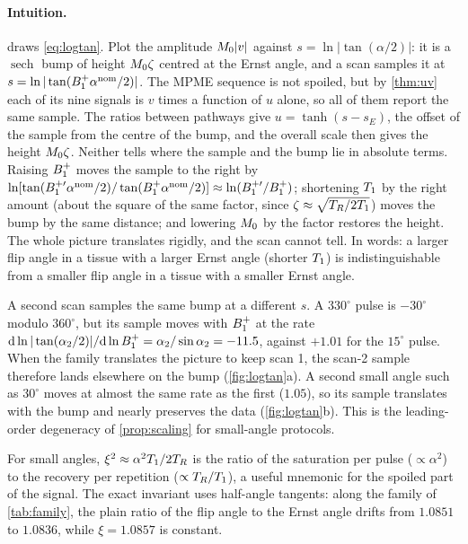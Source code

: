 \paragraph{Intuition.}  draws \eqref{eq:logtan}. Plot the amplitude $M_0|v|$ against
$s=\ln|\tan(\alpha/2)|$: it is a $\operatorname{sech}$ bump of height $M_0\zeta$ centred at the Ernst angle, and a scan
samples it at $s=\ln|\tan(B_1^{+}\alpha^{\rm nom}/2)|$. The MPME sequence is not spoiled, but by
\cref{thm:uv} each of its nine signals is $v$ times a function of $u$ alone, so all of them
report the same sample. The ratios between pathways give $u=\tanh(s-s_E)$, the offset of the
sample from the centre of the bump, and the overall scale then gives the height $M_0\zeta$.
Neither tells where the sample and the bump lie in absolute terms. Raising $B_1^{+}$ moves the
sample to the right by $\ln[\tan(B_1^{+\prime}\alpha^{\rm nom}/2)/\tan(B_1^{+}\alpha^{\rm nom}/2)]\approx\ln(B_1^{+\prime}/B_1^{+})$; shortening $T_1$
by the right amount (about the square of the same factor, since $\zeta\approx\sqrt{T_R/2T_1}$) moves the
bump by the same distance; and lowering $M_0$ by the factor restores the height. The whole
picture translates rigidly, and the scan cannot tell. In words: a larger flip angle in a tissue
with a larger Ernst angle (shorter $T_1$) is indistinguishable from a smaller flip angle in a
tissue with a smaller Ernst angle.

A second scan samples the same bump at a different $s$. A $330^\circ$ pulse is $-30^\circ$ modulo
$360^\circ$, but its sample moves with $B_1^{+}$ at the rate $\mathrm d\ln|\tan(\alpha_2/2)|/\mathrm d\ln B_1^{+}=\alpha_2/\sin\alpha_2=-11.5$,
against $+1.01$ for the $15^\circ$ pulse. When the family translates the picture to keep scan 1,
the scan-2 sample therefore lands elsewhere on the bump (\cref{fig:logtan}a). A second small
angle such as $30^\circ$ moves at almost the same rate as the first ($1.05$), so its sample
translates with the bump and nearly preserves the data (\cref{fig:logtan}b). This is the
leading-order degeneracy of \cref{prop:scaling} for small-angle protocols.

For small angles, $\xi^2\approx\alpha^2T_1/2T_R$ is the ratio of the saturation per pulse ($\propto\alpha^2$) to
the recovery per repetition ($\propto T_R/T_1$), a useful mnemonic for the spoiled part of the signal.
The exact invariant uses half-angle tangents: along the family of \cref{tab:family}, the plain
ratio of the flip angle to the Ernst angle drifts from $1.0851$ to $1.0836$, while $\xi=1.0857$ is
constant.

